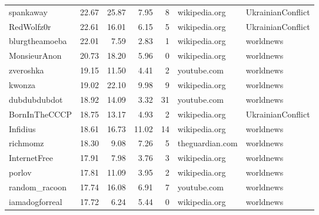 \begin{tabular}{lrrrrll}
spankaway        &       22.67 &     25.87 &       7.95 &          8 &   wikipedia.org &  UkrainianConflict \\
RedWolfz0r       &       22.61 &     16.01 &       6.15 &          5 &   wikipedia.org &  UkrainianConflict \\
blurgtheamoeba   &       22.01 &      7.59 &       2.83 &          1 &   wikipedia.org &          worldnews \\
MonsieurAnon     &       20.73 &     18.20 &       5.96 &          0 &   wikipedia.org &          worldnews \\
zveroshka        &       19.15 &     11.50 &       4.41 &          2 &     youtube.com &          worldnews \\
kwonza           &       19.02 &     22.10 &       9.98 &          9 &   wikipedia.org &          worldnews \\
dubdubdubdot     &       18.92 &     14.09 &       3.32 &         31 &     youtube.com &          worldnews \\
BornInTheCCCP    &       18.75 &     13.17 &       4.93 &          2 &   wikipedia.org &  UkrainianConflict \\
Infidius         &       18.61 &     16.73 &      11.02 &         14 &   wikipedia.org &          worldnews \\
richmomz         &       18.30 &      9.08 &       7.26 &          5 &  theguardian.com &          worldnews \\
InternetFree     &       17.91 &      7.98 &       3.76 &          3 &   wikipedia.org &          worldnews \\
porlov           &       17.81 &     11.09 &       3.95 &          2 &   wikipedia.org &          worldnews \\
random\_racoon    &       17.74 &     16.08 &       6.91 &          7 &     youtube.com &          worldnews \\
iamadogforreal   &       17.72 &      6.24 &       5.44 &          0 &   wikipedia.org &          worldnews \\
\bottomrule
\end{tabular}
